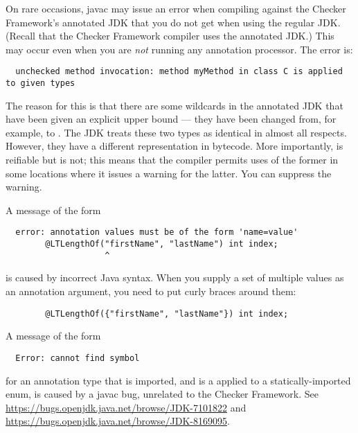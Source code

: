 On rare occasions, javac may issue an error when compiling against the
Checker Framework's annotated JDK that you do not get when using the
regular JDK\@.  (Recall that the Checker Framework compiler uses the
annotated JDK\@.)  This may occur even when you are \emph{not} running any
annotation processor.  The error is:

\begin{Verbatim}
  unchecked method invocation: method myMethod in class C is applied to given types
\end{Verbatim}

The reason for this is that there are some wildcards in the annotated JDK
that have been given an explicit upper bound --- they have been changed
from, for example,  to .  The
JDK treats these two types as identical in almost all respects.  However,
they have a different representation in bytecode.  More importantly,
 is reifiable but  is not; this
means that the compiler permits uses of the former in some locations where
it issues a warning for the latter.  You can suppress the warning.

A message of the form

\begin{Verbatim}
  error: annotation values must be of the form 'name=value'
        @LTLengthOf("firstName", "lastName") int index;
                    ^
\end{Verbatim}

\noindent
is caused by incorrect Java syntax.  When you supply a set of multiple
values as an annotation argument, you need to put curly braces around them:

\begin{Verbatim}
        @LTLengthOf({"firstName", "lastName"}) int index;
\end{Verbatim}

A message of the form

\begin{Verbatim}
  Error: cannot find symbol
\end{Verbatim}

\noindent
for an annotation type that is imported, and is a applied to a
statically-imported enum, is caused by a javac bug, unrelated to the
Checker Framework.  See
\url{https://bugs.openjdk.java.net/browse/JDK-7101822} and \url{https://bugs.openjdk.java.net/browse/JDK-8169095}.



